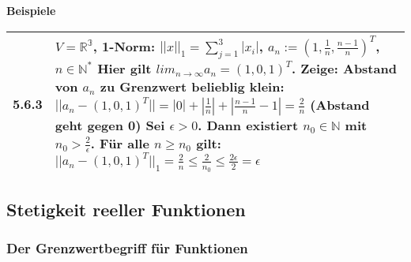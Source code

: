 \noindent
\textbf{Beispiele}
\begin{table}[H]
\begin{tabularx}{\textwidth}{X m{16cm}}
    \toprule

    5.6.3 & $V = \mathbb{R^3}$, 1-Norm: $||x||_1 = \sum^3_{j=1} |x_i|$, $a_n := (1, \frac{1}{n}, \frac{n-1}{n})^T$, $n \in \mathbb{N^*}$ \hfill \break
            Hier gilt $lim_{n \rightarrow \infty} a_n = (1,0,1)^T$. Zeige: Abstand von $a_n$ zu Grenzwert belieblig klein: \hfill \break
            $||a_n - (1,0,1)^T|| = |0| + |\frac{1}{n}| + |\frac{n-1}{n}-1| = \frac{2}{n}$ (Abstand geht gegen 0) \hfill \break
            Sei $\epsilon > 0$. Dann existiert $n_0 \in \mathbb{N}$ mit $n_0 > \frac{2}{\epsilon}$. Für alle $n \geq n_0$ gilt: \hfill \break
            $||a_n - (1,0,1)^T||_1 = \frac{2}{n} \leq \frac{2}{n_0} \leq \frac{2\epsilon}{2} = \epsilon$ \\

    \bottomrule
\end{tabularx}
\end{table}

\subsection{Stetigkeit reeller Funktionen}
\subsubsection{Der Grenzwertbegriff für Funktionen}

